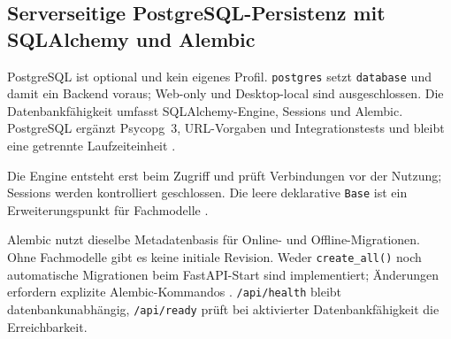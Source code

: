 \subsection{Serverseitige PostgreSQL-Persistenz mit SQLAlchemy und Alembic}
\label{subsec:persistenz-postgresql}

PostgreSQL ist optional und kein eigenes Profil. \texttt{postgres} setzt
\texttt{database} und damit ein Backend voraus; Web-only und Desktop-local
sind ausgeschlossen. Die Datenbankfähigkeit umfasst SQLAlchemy-Engine,
Sessions und Alembic. PostgreSQL ergänzt Psycopg~3, URL-Vorgaben und
Integrationstests und bleibt eine getrennte Laufzeiteinheit
\parencite{postgresql2026docs,kleiveist2026database}.

Die Engine entsteht erst beim Zugriff und prüft Verbindungen vor der Nutzung;
Sessions werden kontrolliert geschlossen. Die leere deklarative \texttt{Base}
ist ein Erweiterungspunkt für Fachmodelle
\parencite{sqlalchemy2026engines}.

Alembic nutzt dieselbe Metadatenbasis für Online- und Offline-Migrationen. Ohne
Fachmodelle gibt es keine initiale Revision. Weder \texttt{create\_all()} noch
automatische Migrationen beim FastAPI-Start sind implementiert; Änderungen
erfordern explizite Alembic-Kommandos
\parencite{alembic2026tutorial,kleiveist2026database}. \texttt{/api/health}
bleibt datenbankunabhängig, \texttt{/api/ready} prüft bei aktivierter
Datenbankfähigkeit die Erreichbarkeit.
